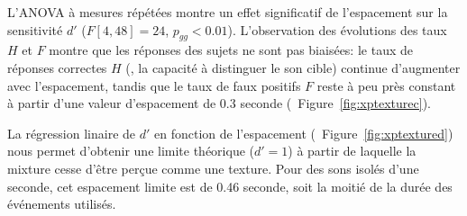 L'ANOVA à mesures répétées montre un effet significatif de l'espacement sur la sensitivité $d'$ ($F[4,48]=24$, $p_{gg}<0.01$). L'observation des évolutions des taux $H$ et $F$ montre que les réponses des sujets ne sont pas biaisées: le taux de réponses correctes $H$ (\ie, la capacité à distinguer le son cible) continue d'augmenter avec l'espacement, tandis que le taux de faux positifs $F$ reste à peu près constant à partir d'une valeur d'espacement de 0.3 seconde (\cf~Figure~\ref{fig:xptexturec}).

La régression linaire de $d'$ en fonction de l'espacement (\cf~Figure~\ref{fig:xptextured}) nous permet d'obtenir une limite théorique ($d'=1$) à partir de laquelle la mixture cesse d'être perçue comme une texture. Pour des sons isolés d'une seconde, cet espacement limite est de 0.46 seconde, soit la moitié de la durée des événements utilisés.

 


